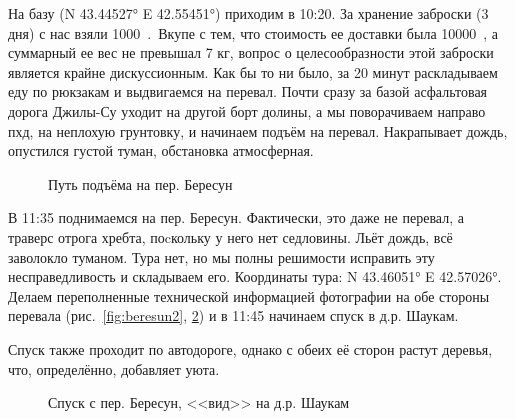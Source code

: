 На базу (N 43.44527° E 42.55451°) приходим в 10:20. За хранение заброски (3 дня) с нас взяли 1000~\faRub.~Вкупе с тем, что стоимость ее доставки была 10000~\faRub, а суммарный ее вес не превышал 7 кг, вопрос о целесообразности этой заброски является крайне дискуссионным. Как бы то ни было, за 20 минут раскладываем еду по рюкзакам и выдвигаемся на перевал. Почти сразу за базой асфальтовая дорога Джилы-Су уходит на другой борт долины, а мы поворачиваем направо пхд, на неплохую грунтовку, и начинаем подъём на перевал. Накрапывает дождь, опустился густой туман, обстановка атмосферная.


\begin{figure}[h!]
	\centering
	\caption{Путь подъёма на пер. Бересун}
	\label{fig:beresun1}
\end{figure}


В 11:35 поднимаемся на пер. Бересун. Фактически, это даже не перевал, а траверс отрога хребта, поcкольку у него нет седловины. Льёт дождь, всё заволокло туманом. Тура нет, но мы полны решимости исправить эту несправедливость и складываем его. Координаты тура: N 43.46051° E 42.57026°. Делаем переполненные технической информацией фотографии на обе стороны перевала (рис.~\ref{fig:beresun2}, \ref{fig:beresun3}) и в 11:45 начинаем спуск в д.р. Шаукам.

\begin{figure}[h!]
	\centering
\begin{minipage}[t]{0.49\textwidth}
	\centering
	\label{fig:beresun2}

\end{minipage}
\hfill
\begin{minipage}[t]{0.49\textwidth}
		\centering
		\label{fig:beresun3}
	
\end{minipage}
\end{figure}
Спуск также проходит по автодороге, однако с обеих её сторон растут деревья, что, определённо, добавляет уюта. 

\begin{figure}[h!]
	\centering
	\caption{Спуск с пер. Бересун, <<вид>> на д.р. Шаукам}
	\label{fig:shaukam}
\end{figure}

